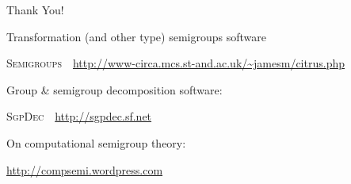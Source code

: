 \documentclass{beamer}
\newcommand{\SgpDec}{\textsc{SgpDec}}
\begin{document}
\begin{frame}
\begin{center}\Huge Thank You!\end{center}
\normalsize

Transformation (and other type) semigroups software
\begin{center}
\textsc{Semigroups}\ \ \url{http://www-circa.mcs.st-and.ac.uk/~jamesm/citrus.php}
\end{center}

Group \& semigroup decomposition software:
\begin{center}
\SgpDec\ \ \url{http://sgpdec.sf.net}
\end{center}

On computational semigroup theory:
\begin{center}
\url{http://compsemi.wordpress.com}
\end{center}


\end{frame}
\end{document}
